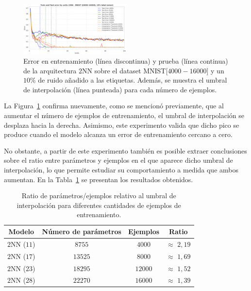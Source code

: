 \begin{figure}[h]
    \centering
    \includegraphics[width=0.5\textwidth]{img/experiments/ratioparamsexamples.png}
    \caption[Ratio parámetros frente a número de ejemplos en el doble descenso.]{Error en entrenamiento (línea discontinua) y prueba (línea continua) de la arquitectura $2$NN sobre el dataset MNIST[$4000-16000$] y un $10$\% de ruido añadido a las etiquetas. Además, se muestra el umbral de interpolación (línea punteada) para cada número de ejemplos.}\label{fig:ratioparamsexamples}
\end{figure}

La Figura~\ref{fig:ratioparamsexamples} confirma nuevamente, como se mencionó previamente, que al aumentar el número de ejemplos de entrenamiento, el umbral de interpolación se desplaza hacia la derecha. Asimismo, este experimento valida que dicho pico se produce cuando el modelo alcanza un error de entrenamiento cercano a cero.\newline

No obstante, a partir de este experimento también es posible extraer conclusiones sobre el ratio entre parámetros y ejemplos en el que aparece dicho umbral de interpolación, lo que permite estudiar su comportamiento a medida que ambos aumentan. En la Tabla~\ref{tab:ratioparamsexamples} se presentan los resultados obtenidos.\newline

\begin{table}[h]
    \centering
    \begin{tabular}{|c|c|c|c|}
    \hline
    \textbf{Modelo}       & \textbf{Número de parámetros} & \textbf{Ejemplos} & \textbf{Ratio} \\ 
    \hline
    $2$NN ($11$)          & $8755$   & $4000$  &  $\approx$ $2,19$  \\ 
    $2$NN ($17$)          & $13525$   & $8000$  &  $\approx$ $1,69$  \\ 
    $2$NN ($23$)          & $18295$   & $12000$  &  $\approx$ $1,52$  \\ 
    $2$NN ($28$)          & $22270$   & $16000$  &  $\approx$ $1,39$  \\ 
    \hline
    \end{tabular}
    \caption[Resumen del ratio parámetros/ejemplos.]{Ratio de parámetros/ejemplos relativo al umbral de interpolación para diferentes cantidades de ejemplos de entrenamiento.}\label{tab:ratioparamsexamples}
\end{table}

